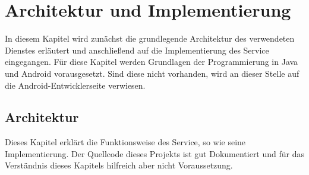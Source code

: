 \documentclass[]{report}
\begin{document}
\chapter{Architektur und Implementierung}
In diesem Kapitel wird zunächst die grundlegende Architektur des verwendeten Dienstes erläutert und anschließend auf die Implementierung des Service eingegangen. Für diese Kapitel werden Grundlagen der Programmierung in Java und Android vorausgesetzt. Sind diese nicht vorhanden, wird an dieser Stelle auf die Android-Entwicklerseite \cite{AndroidDeveoper} verwiesen. 
\section{Architektur}
Dieses Kapitel erklärt die Funktionsweise des Service, so wie seine Implementierung. Der Quellcode dieses Projekts ist gut Dokumentiert und für das Verständnis dieses Kapitels hilfreich aber nicht Voraussetzung. 
\end{document}
